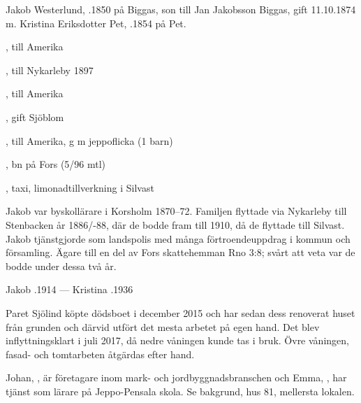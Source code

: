 %
Jakob Westerlund, .1850 på Biggas, son till Jan Jakobsson Biggas, gift 11.10.1874 m. Kristina Eriksdotter Pet, .1854 på Pet.
\begin{jhchildren}
  \item {}, till Amerika
  \item {}, till Nykarleby 1897
  \item {}, till Amerika
  \item {}, gift Sjöblom
  \item {}, till Amerika, g m jeppoflicka (1 barn)
  \item {}, bn på Fors (5/96 mtl)
  \item {}
  \item {}
  \item {}
  \item {}, taxi, limonadtillverkning i Silvast
\end{jhchildren}
Jakob var byskollärare i Korsholm 1870--72. Familjen flyttade via Nykarleby till Stenbacken år 1886/-88, där de bodde fram till 1910, då de flyttade till Silvast. Jakob tjänstgjorde som landspolis med många förtroendeuppdrag i kommun och församling. Ägare till en del av Fors skattehemman Rno 3:8; svårt att veta var de bodde under dessa två år.

Jakob .1914  --- Kristina .1936



%



%
Paret Sjölind köpte dödsboet i december 2015 och har sedan dess renoverat huset från grunden och därvid utfört det mesta arbetet på egen hand. Det blev inflyttningsklart i juli 2017, då nedre våningen kunde tas i bruk. Övre våningen, fasad- och tomtarbeten åtgärdas efter hand.
\begin{jhchildren}
  \item {}
  \item {}
\end{jhchildren}
Johan, , är företagare inom mark- och jordbyggnadsbranschen och Emma, , har tjänst som lärare på Jeppo-Pensala skola. Se bakgrund, hus 81, mellersta lokalen.


